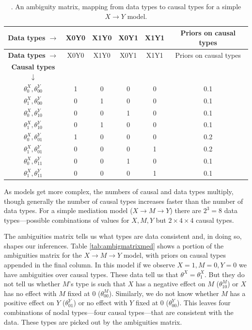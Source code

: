 \documentclass[
  12pt,
]{book}
\begin{document}
\begin{longtable}[]{@{}cccccc@{}}
\caption{\label{tab:ambigmatrix}. An ambiguity matrix, mapping from data types to causal types for a simple \(X \rightarrow Y\) model.}\tabularnewline
\toprule
\textbf{Data types} \(\rightarrow\) & X0Y0 & X1Y0 & X0Y1 & X1Y1 & Priors on causal types \\
\midrule
\endfirsthead
\toprule
\textbf{Data types} \(\rightarrow\) & X0Y0 & X1Y0 & X0Y1 & X1Y1 & Priors on causal types \\
\midrule
\endhead
\textbf{Causal types} \(\downarrow\) & & & & & \\
\(\theta^X_0,\theta^Y_{00}\) & 1 & 0 & 0 & 0 & 0.1 \\
\(\theta^X_1,\theta^Y_{00}\) & 0 & 1 & 0 & 0 & 0.1 \\
\(\theta^X_0,\theta^Y_{10}\) & 0 & 0 & 1 & 0 & 0.1 \\
\(\theta^X_1,\theta^Y_{10}\) & 0 & 1 & 0 & 0 & 0.1 \\
\(\theta^X_0,\theta^Y_{01}\) & 1 & 0 & 0 & 0 & 0.2 \\
\(\theta^X_1,\theta^Y_{01}\) & 0 & 0 & 0 & 1 & 0.2 \\
\(\theta^X_0,\theta^Y_{11}\) & 0 & 0 & 1 & 0 & 0.1 \\
\(\theta^X_1,\theta^Y_{11}\) & 0 & 0 & 0 & 1 & 0.1 \\
\bottomrule
\end{longtable}

As models get more complex, the numbers of causal and data types multiply, though generally the number of causal types increases faster than the number of data types. For a simple mediation model (\(X \rightarrow M \rightarrow Y\)) there are \(2^3 = 8\) data types---possible combinations of values for \(X,M,Y\) but \(2\times 4 \times 4\) causal types.

The ambiguities matrix tells us what types are data consistent and, in doing so, shapes our inferences.
Table \ref{tab:ambigmatrixmed} shows a portion of the ambiguities matrix for the \(X \rightarrow M \rightarrow Y\) model, with priors on causal types appended in the final column. In this model if we observe \(X=1, M=0, Y=0\) we have ambiguities over causal types. These data tell us that \(\theta^X = \theta^X_1\). But they do not tell us whether \(M\)'s type is such that \(X\) has a negative effect on \(M\) (\(\theta^M_{10}\)) or \(X\) has no effect with \(M\) fixed at \(0\) (\(\theta^M_{00}\)). Similarly, we do not know whether \(M\) has a positive effect on \(Y\) (\(\theta^Y_{01}\)) or no effect with \(Y\) fixed at \(0\) (\(\theta^Y_{00}\)). This leaves four combinations of nodal types---four causal types---that are consistent with the data. These types are picked out by the ambiguities matrix.
\end{document}
